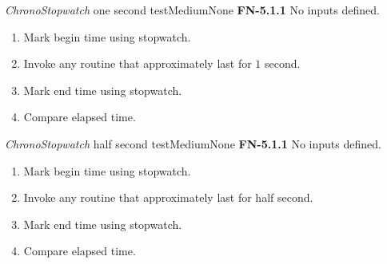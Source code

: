 \begin{testcase}{\emph{ChronoStopwatch} one second test}{Medium}{None}
	{
		\textbf{FN-5.1.1}
	}
	{
		No inputs defined.
	}
	{
		\begin{enumerate}
			\item Mark begin time using stopwatch.
			\item Invoke any routine that approximately last for $1$ second.
			\item Mark end time using stopwatch.
			\item Compare elapsed time.
		\end{enumerate}
	}
\end{testcase}
\begin{testcase}{\emph{ChronoStopwatch} half second test}{Medium}{None}
	{
		\textbf{FN-5.1.1}
	}
	{
		No inputs defined.
	}
	{
		\begin{enumerate}
			\item Mark begin time using stopwatch.
			\item Invoke any routine that approximately last for half second.
			\item Mark end time using stopwatch.
			\item Compare elapsed time.
		\end{enumerate}
	}
\end{testcase}